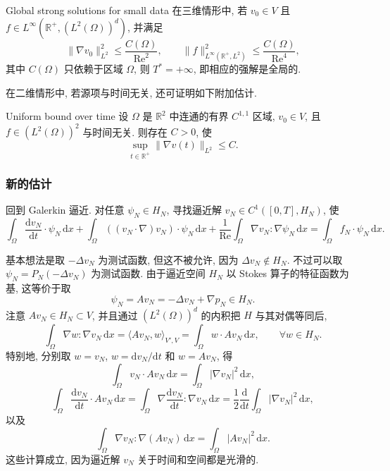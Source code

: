 \begin{Theorem}{Global strong solutions for small data}
\label{thm:chap5-global-strong-small-data}
在三维情形中, 若 $v_0\in V$ 且 $f\in L^\infty(\mathbb R^+,(L^2(\Omega))^d)$, 并满足
\[
 \|\nabla v_0\|_{L^2}^2\leq\frac{C(\Omega)}{\operatorname{Re}^2},
 \qquad
 \|f\|_{L^\infty(\mathbb R^+,L^2)}^2\leq\frac{C(\Omega)}{\operatorname{Re}^4},
\]
其中 $C(\Omega)$ 只依赖于区域 $\Omega$, 则 $T^*=+\infty$, 即相应的强解是全局的.
\end{Theorem}

在二维情形中, 若源项与时间无关, 还可证明如下附加估计.

\begin{Theorem}{Uniform bound over time}
\label{thm:chap5-uniform-strong-bound}
设 $\Omega$ 是 $\mathbb R^2$ 中连通的有界 $C^{1,1}$ 区域, $v_0\in V$, 且 $f\in(L^2(\Omega))^2$ 与时间无关. 则存在 $C>0$, 使
\[
 \sup_{t\in\mathbb R^+}\|\nabla v(t)\|_{L^2}\leq C.
\]
\end{Theorem}

\subsubsection{新的估计}
\label{subsec:chap5-strong-new-estimates}

回到 Galerkin 逼近. 对任意 $\psi_N\in H_N$, 寻找逼近解 $v_N\in C^1([0,T],H_N)$, 使
\begin{equation}
 \int_\Omega\frac{\mathrm dv_N}{\mathrm dt}\cdot\psi_N\,\mathrm dx
 +\int_\Omega((v_N\cdot\nabla)v_N)\cdot\psi_N\,\mathrm dx
 +\frac1{\operatorname{Re}}\int_\Omega\nabla v_N:\nabla\psi_N\,\mathrm dx
 =\int_\Omega f_N\cdot\psi_N\,\mathrm dx.
\label{eq:chap5-strong-galerkin-problem}
\end{equation}

基本想法是取 $-\Delta v_N$ 为测试函数, 但这不被允许, 因为 $\Delta v_N\notin H_N$. 不过可以取 $\psi_N=P_N(-\Delta v_N)$ 为测试函数. 由于逼近空间 $H_N$ 以 Stokes 算子的特征函数为基, 这等价于取
\[
 \psi_N=Av_N=-\Delta v_N+\nabla p_N\in H_N.
\]
注意 $Av_N\in H_N\subset V$, 并且通过 $(L^2(\Omega))^d$ 的内积把 $H$ 与其对偶等同后,
\[
 \int_\Omega\nabla w:\nabla v_N\,\mathrm dx
 =\langle Av_N,w\rangle_{V',V}
 =\int_\Omega w\cdot Av_N\,\mathrm dx,
 \qquad\forall w\in H_N.
\]
特别地, 分别取 $w=v_N$, $w=\mathrm dv_N/\mathrm dt$ 和 $w=Av_N$, 得
\[
 \int_\Omega v_N\cdot Av_N\,\mathrm dx=\int_\Omega|\nabla v_N|^2\,\mathrm dx,
\]
\[
 \int_\Omega\frac{\mathrm dv_N}{\mathrm dt}\cdot Av_N\,\mathrm dx
 =\int_\Omega\nabla\frac{\mathrm dv_N}{\mathrm dt}:\nabla v_N\,\mathrm dx
 =\frac12\frac{\mathrm d}{\mathrm dt}\int_\Omega|\nabla v_N|^2\,\mathrm dx,
\]
以及
\[
 \int_\Omega\nabla v_N:\nabla(Av_N)\,\mathrm dx=\int_\Omega|Av_N|^2\,\mathrm dx.
\]
这些计算成立, 因为逼近解 $v_N$ 关于时间和空间都是光滑的.

